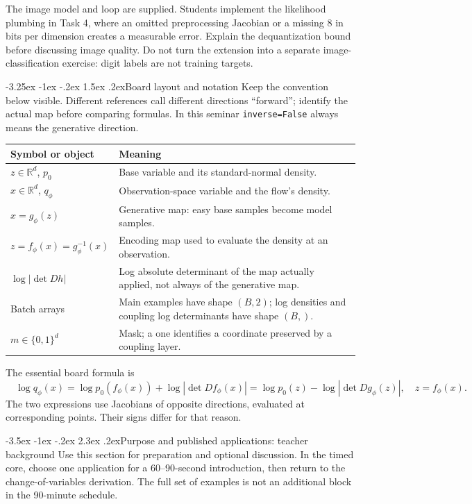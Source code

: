 \documentclass[11pt,a4paper]{article}
\makeatletter
\newcommand{\R}{\mathbb R}
\renewcommand\section{\@startsection{section}{1}{\z@}%
  {-3.5ex \@plus -1ex \@minus -.2ex}%
  {2.3ex \@plus .2ex}{\normalfont\Large}}
\renewcommand\subsection{\@startsection{subsection}{2}{\z@}%
  {-3.25ex \@plus -1ex \@minus -.2ex}%
  {1.5ex \@plus .2ex}{\normalfont\large}}
\makeatother
\begin{document}
The image model and loop are supplied. Students implement the likelihood
plumbing in Task 4, where an omitted preprocessing Jacobian or a missing
$8$ in bits per dimension creates a measurable error. Explain the dequantization
bound before discussing image quality. Do not turn the extension into a
separate image-classification exercise: digit labels are not training targets.

\subsection{Board layout and notation}
Keep the convention below visible. Different references call different
directions ``forward''; identify the actual map before comparing formulas.
In this seminar \texttt{inverse=False} always means the generative direction.
\begin{center}
\begin{tabular}{@{}p{38mm}p{119mm}@{}}
\toprule
Symbol or object & Meaning \\
\midrule
$z\in\R^d$, $p_0$ & Base variable and its standard-normal density. \\
$x\in\R^d$, $q_\phi$ & Observation-space variable and the flow's density. \\
$x=g_\phi(z)$ & Generative map: easy base samples become model samples. \\
$z=f_\phi(x)=g_\phi^{-1}(x)$ & Encoding map used to evaluate the density at an observation. \\
$\log|\det Dh|$ & Log absolute determinant of the map actually applied, not
always of the generative map. \\
Batch arrays & Main examples have shape $(B,2)$; log densities and coupling
log determinants have shape $(B,)$. \\
$m\in\{0,1\}^d$ & Mask; a one identifies a coordinate preserved by a coupling layer. \\
\bottomrule
\end{tabular}
\end{center}

The essential board formula is
\[
\boxed{\quad
 \log q_\phi(x)
 =\log p_0(f_\phi(x))+\log|\det Df_\phi(x)|
 =\log p_0(z)-\log|\det Dg_\phi(z)|,
 \quad z=f_\phi(x).\quad}
\]
The two expressions use Jacobians of opposite directions, evaluated at
corresponding points. Their signs differ for that reason.

\section{Purpose and published applications: teacher background}
Use this section for preparation and optional discussion. In the timed core,
choose one application for a 60--90-second introduction, then return to the
change-of-variables derivation. The full set of examples is not an additional
block in the 90-minute schedule.
\end{document}

